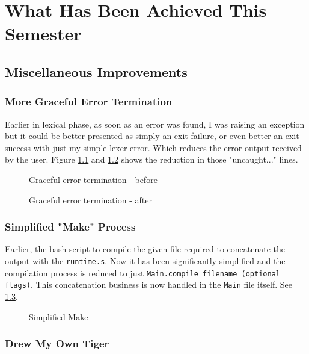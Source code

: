 \chapter{What Has Been Achieved This Semester}

\section{Miscellaneous Improvements}

\subsection{More Graceful Error Termination}

Earlier in lexical phase, as soon as an error was found, I was raising an exception but it could be better presented as simply an exit failure, or even better an exit success with just my simple lexer error. Which reduces the error output received by the user. Figure \ref{fig:gr1} and \ref{fig:gr2} shows the reduction in those "uncaught..." lines.

\begin{figure}
	\centering
	\caption{Graceful error termination - before}
	\label{fig:gr1}
\end{figure}
\begin{figure}
	\centering
	\caption{Graceful error termination - after}
	\label{fig:gr2}
\end{figure}

\subsection{Simplified "Make" Process}

Earlier, the bash script to compile the given file required to concatenate the output with the \texttt{runtime.s}. Now it has been significantly simplified and the compilation process is reduced to just \texttt{Main.compile filename (optional flags)}. This concatenation business is now handled in the \texttt{Main} file itself. See \ref{fig:sm}.

\begin{figure}
	\centering
	\caption{Simplified Make}
	\label{fig:sm}
\end{figure}

\subsection{Drew My Own Tiger}

